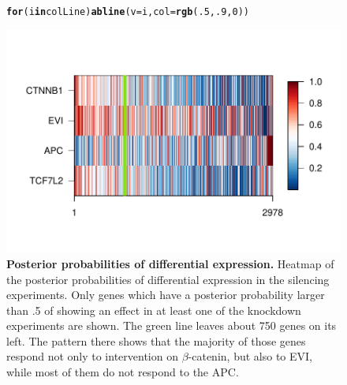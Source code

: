 \documentclass[a4paper]{article}
\makeatletter
\def\maxwidth{ %
  \ifdim\Gin@nat@width>\linewidth
    \linewidth
  \else
    \Gin@nat@width
  \fi
}
\newcommand{\hlnum}[1]{\textcolor[rgb]{0.686,0.059,0.569}{#1}}%
\newcommand{\hlstd}[1]{\textcolor[rgb]{0.345,0.345,0.345}{#1}}%
\newcommand{\hlkwa}[1]{\textcolor[rgb]{0.161,0.373,0.58}{\textbf{#1}}}%
\newcommand{\hlkwc}[1]{\textcolor[rgb]{0.333,0.667,0.333}{#1}}%
\newcommand{\hlkwd}[1]{\textcolor[rgb]{0.737,0.353,0.396}{\textbf{#1}}}%
\newenvironment{kframe}{%
 \def\at@end@of@kframe{}%
 \ifinner\ifhmode%
  \def\at@end@of@kframe{\end{minipage}}%
  \begin{minipage}{\columnwidth}%
 \fi\fi%
 \def\FrameCommand##1{\hskip\@totalleftmargin \hskip-\fboxsep
 \colorbox{shadecolor}{##1}\hskip-\fboxsep
     \hskip-\linewidth \hskip-\@totalleftmargin \hskip\columnwidth}%
 \MakeFramed {\advance\hsize-\width
   \@totalleftmargin\z@ \linewidth\hsize
   \@setminipage}}%
 {\par\unskip\endMakeFramed%
 \at@end@of@kframe}
\newenvironment{knitrout}{}{} %
\makeatother
\begin{document}
\begin{figure}[htbp]
\begin{center}
\begin{knitrout}
\begin{kframe}
\begin{alltt}
\hlkwa{for}\hlstd{(i} \hlkwa{in} \hlstd{colLine)} \hlkwd{abline}\hlstd{(}\hlkwc{v}\hlstd{=i,} \hlkwc{col}\hlstd{=}\hlkwd{rgb}\hlstd{(}\hlnum{.5}\hlstd{,}\hlnum{.9}\hlstd{,}\hlnum{0}\hlstd{))}
\end{alltt}
\end{kframe}
\includegraphics[width=\maxwidth]{figure/minPsRBgreen} 

\end{knitrout}
\caption{{\bf Posterior probabilities of differential expression.} Heatmap of the posterior probabilities of differential expression in the silencing experiments. Only genes which have a posterior probability larger than .5 of showing an effect in at least one of the knockdown experiments are shown. The green line leaves about 750 genes on its left. The pattern there shows that the majority of those genes respond not only to intervention on $\beta$-catenin, but also to EVI, while most of them do not respond to the APC.}
\label{fig:heatmap}
\end{center}
\end{figure}
\end{document}
